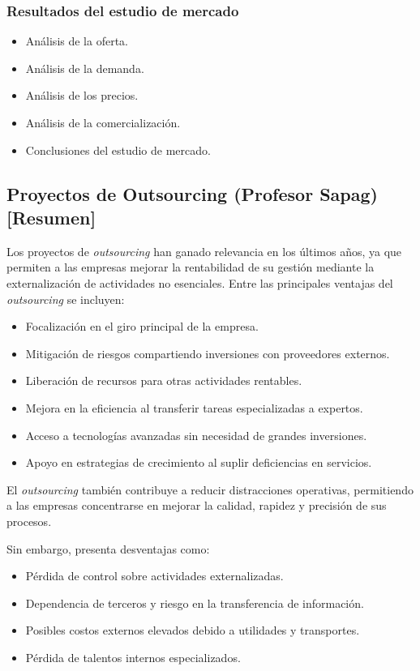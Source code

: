 \documentclass{templateNote}
\begin{document}
\subsubsection{Resultados del estudio de mercado}
\begin{itemize}
    \item Análisis de la oferta.
    \item Análisis de la demanda.
    \item Análisis de los precios.
    \item Análisis de la comercialización.
    \item Conclusiones del estudio de mercado.
\end{itemize}

\subsection{Proyectos de Outsourcing (Profesor Sapag) [Resumen]}

Los proyectos de \textit{outsourcing} han ganado relevancia en los últimos años, ya que permiten a las empresas mejorar la rentabilidad de su gestión mediante la externalización de actividades no esenciales. Entre las principales ventajas del \textit{outsourcing} se incluyen:
\begin{itemize}
    \item Focalización en el giro principal de la empresa.
    \item Mitigación de riesgos compartiendo inversiones con proveedores externos.
    \item Liberación de recursos para otras actividades rentables.
    \item Mejora en la eficiencia al transferir tareas especializadas a expertos.
    \item Acceso a tecnologías avanzadas sin necesidad de grandes inversiones.
    \item Apoyo en estrategias de crecimiento al suplir deficiencias en servicios.
\end{itemize}

El \textit{outsourcing} también contribuye a reducir distracciones operativas, permitiendo a las empresas concentrarse en mejorar la calidad, rapidez y precisión de sus procesos.

Sin embargo, presenta desventajas como:
\begin{itemize}
    \item Pérdida de control sobre actividades externalizadas.
    \item Dependencia de terceros y riesgo en la transferencia de información.
    \item Posibles costos externos elevados debido a utilidades y transportes.
    \item Pérdida de talentos internos especializados.
\end{itemize}
\end{document}
